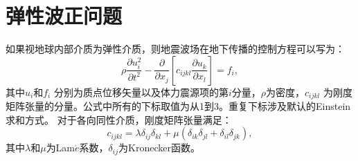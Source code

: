 \section{弹性波正问题}
\label{sec:forward_problem}
如果视地球内部介质为弹性介质，则地震波场在地下传播的控制方程可以写为：
\begin{equation}
	\rho \frac{\partial u^2_i}{\partial t^2}  -
	\frac{\partial}{\partial x_j}\left[c_{ijkl}\frac{\partial u_{k}}{\partial
	x_l}\right]=f_i,
	\label{eq:WE} 
\end{equation}
其中$u_i$和$f_i$ 分别为质点位移矢量以及体力震源项的第$i$分量，$\rho$为密度，$c_{ijkl}$
为刚度矩阵张量的分量。公式中所有的下标取值为从1到3。重复下标涉及默认的Einstein求和方式。
对于各向同性介质，刚度矩阵张量满足：
\begin{equation}
	c_{ijkl}=\lambda\delta_{ij}\delta
	_{kl}+\mu(\delta_{ik}\delta _{jl}+\delta _{il}\delta_{jk}),
	\label{Lame}
\end{equation}
其中$\lambda$和$\mu$为Lam$\acute{e}$系数，$\delta_{ij}$为Kronecker函数。 

